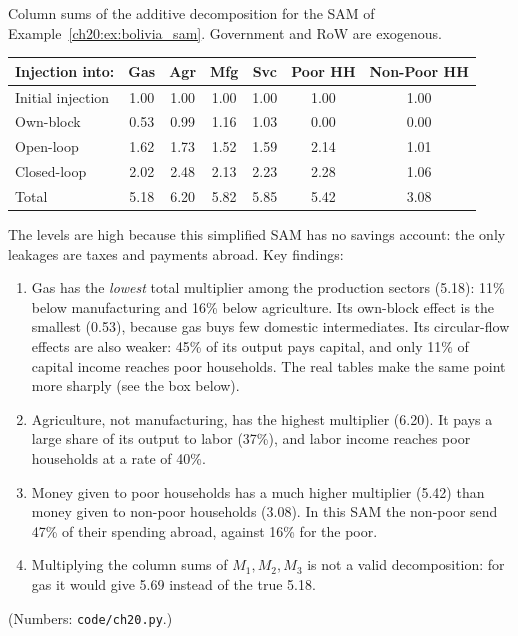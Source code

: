 \documentclass[../structural_economics_book.tex]{subfiles}
\begin{document}
\begin{example}\label{ch20:ex:multipliers}
Column sums of the additive decomposition for the SAM of Example~\ref{ch20:ex:bolivia_sam}. Government and RoW are exogenous.

\begin{center}
\begin{tabular}{lcccccc}
\toprule
Injection into: & Gas & Agr & Mfg & Svc & Poor HH & Non-Poor HH \\
\midrule
Initial injection & 1.00 & 1.00 & 1.00 & 1.00 & 1.00 & 1.00 \\
Own-block & 0.53 & 0.99 & 1.16 & 1.03 & 0.00 & 0.00 \\
Open-loop & 1.62 & 1.73 & 1.52 & 1.59 & 2.14 & 1.01 \\
Closed-loop & 2.02 & 2.48 & 2.13 & 2.23 & 2.28 & 1.06 \\
\midrule
Total & 5.18 & 6.20 & 5.82 & 5.85 & 5.42 & 3.08 \\
\bottomrule
\end{tabular}
\end{center}

The levels are high because this simplified SAM has no savings account: the only leakages are taxes and payments abroad. Key findings:
\begin{enumerate}
\item Gas has the \textit{lowest} total multiplier among the production sectors (5.18): 11\% below manufacturing and 16\% below agriculture. Its own-block effect is the smallest (0.53), because gas buys few domestic intermediates. Its circular-flow effects are also weaker: 45\% of its output pays capital, and only 11\% of capital income reaches poor households. The real tables make the same point more sharply (see the box below).
\item Agriculture, not manufacturing, has the highest multiplier (6.20). It pays a large share of its output to labor (37\%), and labor income reaches poor households at a rate of 40\%.
\item Money given to poor households has a much higher multiplier (5.42) than money given to non-poor households (3.08). In this SAM the non-poor send 47\% of their spending abroad, against 16\% for the poor.
\item Multiplying the column sums of $M_1, M_2, M_3$ is not a valid decomposition: for gas it would give 5.69 instead of the true 5.18.
\end{enumerate}
(Numbers: \texttt{code/ch20.py}.)
\end{example}
\end{document}
